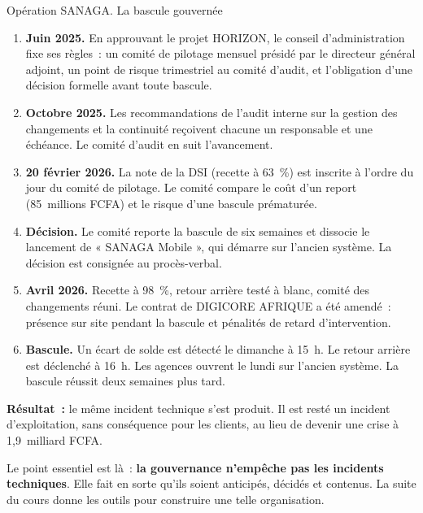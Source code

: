 \begin{boxscenario}{Opération SANAGA. La bascule gouvernée}
\begin{enumerate}
    \item \textbf{Juin 2025.} En approuvant le projet HORIZON, le conseil
          d'administration fixe ses règles~: un comité de pilotage mensuel
          présidé par le directeur général adjoint, un point de risque
          trimestriel au comité d'audit, et l'obligation d'une décision
          formelle avant toute bascule.
    \item \textbf{Octobre 2025.} Les recommandations de l'audit interne sur
          la gestion des changements et la continuité reçoivent chacune un
          responsable et une échéance. Le comité d'audit en suit l'avancement.
    \item \textbf{20 février 2026.} La note de la DSI (recette à 63~\%) est
          inscrite à l'ordre du jour du comité de pilotage. Le comité
          compare le coût d'un report (85~millions FCFA) et le risque d'une
          bascule prématurée.
    \item \textbf{Décision.} Le comité reporte la bascule de six semaines et
          dissocie le lancement de « SANAGA Mobile », qui démarre sur
          l'ancien système. La décision est consignée au procès-verbal.
    \item \textbf{Avril 2026.} Recette à 98~\%, retour arrière testé à
          blanc, comité des changements réuni. Le contrat de DIGICORE
          AFRIQUE a été amendé~: présence sur site pendant la bascule et
          pénalités de retard d'intervention.
    \item \textbf{Bascule.} Un écart de solde est détecté le dimanche à
          15~h. Le retour arrière est déclenché à 16~h. Les agences ouvrent
          le lundi sur l'ancien système. La bascule réussit deux semaines
          plus tard.
\end{enumerate}
\textbf{Résultat~:} le même incident technique s'est produit. Il est resté
un incident d'exploitation, sans conséquence pour les clients, au lieu de
devenir une crise à 1,9~milliard FCFA.
\end{boxscenario}

Le point essentiel est là~: \textbf{la gouvernance n'empêche pas les
incidents techniques}. Elle fait en sorte qu'ils soient anticipés, décidés
et contenus. La suite du cours donne les outils pour construire une telle
organisation.

\separateur

